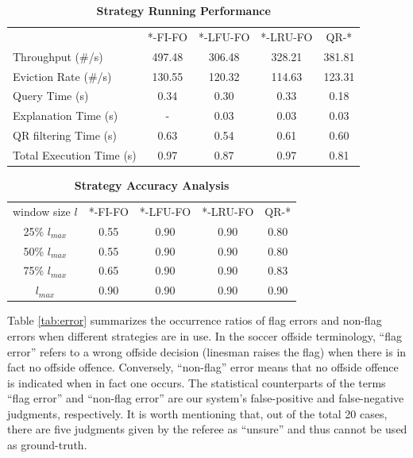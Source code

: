 \begin{table}[!htbp]
\centering
\caption{\textbf{Strategy Running Performance}}
\label{tb:rp}
\begin{tabular}{|l||c|c|c|c|}
\hline
 & *-FI-FO & *-LFU-FO & *-LRU-FO & QR-* \\ \hhline{|=#=|=|=|=|}
Throughput (\#/s) & 497.48 & 306.48 & 328.21 & 381.81 \\ \hline
Eviction Rate (\#/s) & 130.55 & 120.32 & 114.63 & 123.31 \\ \hline
Query Time (s) & 0.34 & 0.30 & 0.33 & 0.18 \\ \hline
Explanation Time (s) & - & 0.03 & 0.03 & 0.03 \\ \hline
QR filtering Time (s) & 0.63 & 0.54 & 0.61 & 0.60 \\ \hhline{|=#=|=|=|=|}
Total Execution Time (s) & 0.97 & 0.87 & 0.97 & 0.81 \\ \hline
\end{tabular}
\end{table}

\begin{table}[!htbp]
\centering
\caption{\textbf{Strategy Accuracy Analysis}}
\label{tb:accuracy}
\begin{tabular}{|c||c|c|c|c|}
\hline
window size $l$ & *-FI-FO & *-LFU-FO & *-LRU-FO & QR-* \\ \hhline{|=#=|=|=|=|}
25\% $l_{max}$ & 0.55 & 0.90 & 0.90 & 0.80 \\ \hline
50\% $l_{max}$ & 0.55 & 0.90 & 0.90 & 0.80 \\ \hline
75\% $l_{max}$ & 0.65 & 0.90 & 0.90 & 0.83 \\ \hline
$l_{max}$ & 0.90 & 0.90 & 0.90 & 0.90 \\ \hline
\end{tabular}
\end{table}

Table \ref{tab:error} summarizes the occurrence ratios of flag errors and non-flag errors when different strategies are in use. 
In the soccer offside terminology, ``flag error'' refers to a wrong offside decision (linesman raises the flag) when there is in fact no offside offence.
Conversely, ``non-flag'' error means that no offside offence is indicated when in fact one occurs. 
The statistical counterparts of the terms ``flag error'' and ``non-flag error'' are our system's false-positive and false-negative judgments, respectively. 
It is worth mentioning that, out of the total 20 cases, there are five judgments given by the referee as ``unsure'' and thus cannot be used as ground-truth. 

